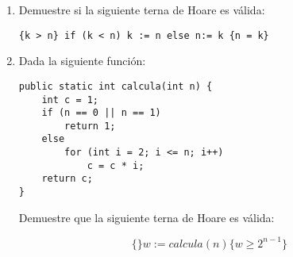 \documentclass[11pt]{article}
\begin{document}
\begin{enumerate}
\begin{proof}[Solución]
   \begin{equation*}
     \begin{split}
       Z_{n+1} & = X + (n + 1)Y = X + nY + Y \\
       & = X + Y(Y - W_n) + Y \hspace{2cm}\ldots \text{usando el hecho que n = } Y
       - W_n\\
       & = X + Y^2 - YW_n + Y\\
       & = X + Y^2 - Y(W_n - 1)\\
       & = X + Y^2 - Y(Y - n - 1) \hspace{1.5cm}\ldots W_n = Y - n\\
       & = X + Y^2 - Y(Y - (n + 1))\\
       & = X + Y^2 - YW_{n + 1} \hspace{2.5cm}\ldots W_{n+1} = Y - (n + 1)
     \end{split}
   \end{equation*}

   Por lo tanto se cumple el paso inductivo y por el principio de
   inducción $Z_n = X + nY = X + Y(Y - W_n) = X + Y^2 - YW_n$.

   \textbf{Este procedimiento lo que hace es calcular $X + Y^2$, en la
     iteración 0, Z vale X y cuando la iteración n = Y,  la rutina
     regresa $Z = X + Y^2$, terminando el ciclo y la ejecución}
  \end{proof}

  \begin{algorithm}
    \caption{}
    \begin{algorithmic}
      \State $Z \leftarrow X$
      \State $W \leftarrow Y$
      \State $Z \leftarrow Z - 1$
      \State $W \leftarrow W - 1$
      \EndWhile
      \State \textbf{return} Z
      \EndProcedure
    \end{algorithmic}
  \end{algorithm}

\item Demuestre si la siguiente terna de Hoare es válida:


\begin{verbatim}
{k > n} if (k < n) k := n else n:= k {n = k}
\end{verbatim}

\item Dada la siguiente función:
\begin{verbatim}
public static int calcula(int n) {
    int c = 1;
    if (n == 0 || n == 1)
        return 1;
    else
        for (int i = 2; i <= n; i++)
            c = c * i;
    return c;
}
\end{verbatim}
  Demuestre que la siguiente terna de Hoare es válida:

\begin{equation*}
\{\}  w:= calcula(n) \{w \ge 2^{n - 1}\}
\end{equation*}

\end{enumerate}
\end{document}
